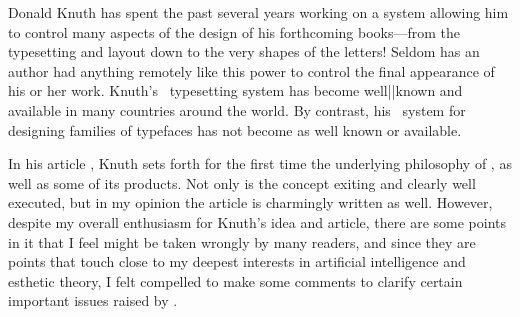 Donald Knuth has spent the past several years working on a
system allowing him to control many aspects of the design
of his forthcoming books---from the typesetting and layout
down to the very shapes of the letters! Seldom has an
author had anything remotely like this power to control the
final appearance of his or her work. Knuth's \TEX\
typesetting system has become well||known and available in
many countries around the world. By contrast, his
\METAFONT\ system for designing families of typefaces has
not become as well known or available. 

In his article , 
Knuth sets forth for the first time the underlying 
philosophy of \METAFONT, as well as some of its products. 
Not only is the concept exiting and clearly well executed, 
but in my opinion the article is charmingly written as well.
However, despite my overall enthusiasm for Knuth's idea and 
article, there are some points in it that I feel might be 
taken wrongly by many readers, and since they are points 
that touch close to my deepest interests in artificial 
intelligence and esthetic theory, I felt compelled to make 
some comments to clarify certain important issues raised by 
. 
